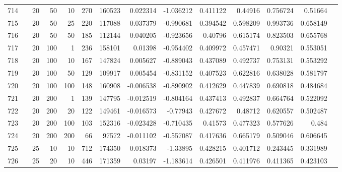 \begin{longtable}{llrrrrrrrrrrrr}
		714 & &           20 &                50 &           10 &         270 &     160523 &  0.022314 & -1.036212 &  0.411122 &     0.44916 &       0.756724 &   0.51664 \\
		715 & &           20 &                50 &           25 &         220 &     117088 &  0.037379 & -0.990681 &  0.394542 &    0.598209 &       0.993736 &  0.658149 \\
		716 & &           20 &                50 &           50 &         185 &     112144 &  0.040205 & -0.923656 &   0.40796 &    0.615174 &       0.823503 &  0.655768 \\
		717 & &           20 &               100 &            1 &         236 &     158101 &   0.01398 & -0.954402 &  0.409972 &    0.457471 &        0.90321 &  0.553051 \\
		718 & &           20 &               100 &           10 &         167 &     147824 &  0.005627 & -0.889043 &  0.437089 &    0.492737 &       0.753131 &  0.553292 \\
		719 & &           20 &               100 &           50 &         129 &     109917 &  0.005454 & -0.831152 &  0.407523 &    0.622816 &       0.638028 &  0.581797 \\
		720 & &           20 &               100 &          100 &         148 &     160908 & -0.006538 & -0.890902 &  0.412629 &    0.447839 &       0.690818 &  0.484684 \\
		721 & &           20 &               200 &            1 &         139 &     147795 & -0.012519 & -0.804164 &  0.437413 &    0.492837 &       0.664764 &  0.522092 \\
		722 & &           20 &               200 &           20 &         122 &     149461 & -0.016573 &  -0.77943 &  0.427672 &     0.48712 &       0.620557 &  0.502487 \\
		723 & &           20 &               200 &          100 &         103 &     152316 & -0.023428 & -0.710435 &   0.41573 &    0.477323 &       0.577626 &     0.484 \\
		724 & &           20 &               200 &          200 &          66 &      97572 & -0.011102 & -0.557087 &  0.417636 &    0.665179 &       0.509046 &  0.606645 \\
		725 & &           25 &                10 &           10 &         712 &     174350 &  0.018373 &  -1.33895 &  0.428215 &    0.401712 &       0.243445 &  0.331989 \\
		726 & &           25 &                20 &           10 &         446 &     171359 &   0.03197 & -1.183614 &  0.426501 &    0.411976 &       0.411365 &  0.423103 \\

\end{longtable}
